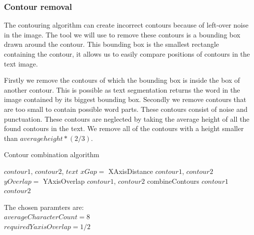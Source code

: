 \documentclass{article}
\begin{document}
\subsubsection{Contour removal}
The contouring algorithm can create incorrect contours because of left-over noise in the image.
The tool we will use to remove these contours is a bounding box drawn around the contour.
This bounding box is the smallest rectangle containing the contour, it allows us to easily compare positions of contours in the text image.

Firstly we remove the contours of which the bounding box is inside the box of another contour.
This is possible as text segmentation returns the word in the image contained by its biggest bounding box. 
Secondly we remove contours that are too small to contain possible word parts. These contours consist of noise and punctuation.
These contours are neglected by taking the average height of all the found contours in the text.
We remove all of the contours with a height smaller than $average height * (2/3)$.



\begin{algorithm}[tb]
    \caption{Contour combination algorithm}
   \label{alg:overlap}
\begin{algorithmic}
      $contour1$, $contour2$, $text$
    \STATE $xGap =$ XAxisDistance $contour1$, $contour2$
    \STATE $yOverlap =$ YAxisOverlap $contour1$, $contour2$
    \vspace{4px}
    \STATE combineContours $contour1$ $contour2$
    \ENDIF
\end{algorithmic}
The chosen paramters are:
\\
$averageCharacterCount = 8$ 
\\
$requiredYaxisOverlap = 1/2$
\end{algorithm}
\end{document}
